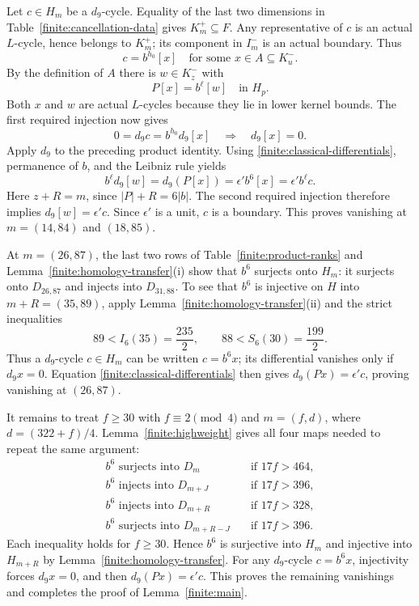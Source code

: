 \documentclass[11pt]{article}
\theoremstyle{definition}
\theoremstyle{remark}
\numberwithin{equation}{section}
\begin{document}
Let $c\in H_m$ be a $d_9$-cycle.  Equality of the last two
dimensions in Table~\ref{finite:cancellation-data} gives
$K^+_m\subseteq F$.  Any representative of $c$ is an actual
$L$-cycle, hence belongs to $K^+_m$; its component in $I^-_m$ is
an actual boundary.  Thus
\[
 c=b^{h_0}[x]\quad\text{for some }x\in A\subseteq K^-_u.
\]
By the definition of $A$ there is $w\in K^-_z$ with
\[
 P[x]=b^\ell[w]\quad\text{in }H_p.
\]
Both $x$ and $w$ are actual $L$-cycles because they lie in lower
kernel bounds.  The first required injection now gives
\[
 0=d_9c=b^{h_0}d_9[x]\quad\Longrightarrow\quad d_9[x]=0.
\]
Apply $d_9$ to the preceding product identity.  Using
\eqref{finite:classical-differentials}, permanence of $b$, and the
Leibniz rule yields
\[
 b^\ell d_9[w]=d_9(P[x])=\epsilon'b^6[x]
                         =\epsilon'b^\ell c.
\]
Here $z+R=m$, since $|P|+R=6|b|$.
The second required injection therefore implies
$d_9[w]=\epsilon'c$.  Since $\epsilon'$ is a unit, $c$ is a
boundary.  This proves vanishing at $m=(14,84)$ and $(18,85)$.

At $m=(26,87)$, the last two rows of
Table~\ref{finite:product-ranks} and
Lemma~\ref{finite:homology-transfer}\textup{(i)} show that $b^6$
surjects onto $H_m$: it surjects onto $D_{26,87}$ and injects into
$D_{31,88}$.  To see that $b^6$ is injective on $H$ into
$m+R=(35,89)$, apply
Lemma~\ref{finite:homology-transfer}\textup{(ii)} and the strict
inequalities
\[
 89<I_6(35)=\frac{235}{2},\qquad
 88<S_6(30)=\frac{199}{2}.
\]
Thus a $d_9$-cycle $c\in H_m$ can be written $c=b^6x$; its
differential vanishes only if $d_9x=0$.  Equation
\eqref{finite:classical-differentials} then gives
$d_9(Px)=\epsilon'c$, proving vanishing at $(26,87)$.

It remains to treat $f\geq30$ with $f\equiv2\pmod4$ and
$m=(f,d)$, where $d=(322+f)/4$.  Lemma~\ref{finite:highweight}
gives all four maps needed to repeat the same argument:
\begin{align*}
 b^6\text{ surjects into }D_m
   &\quad\text{if }17f>464,\\
 b^6\text{ injects into }D_{m+J}
   &\quad\text{if }17f>396,\\
 b^6\text{ injects into }D_{m+R}
   &\quad\text{if }17f>328,\\
 b^6\text{ surjects into }D_{m+R-J}
   &\quad\text{if }17f>396.
\end{align*}
Each inequality holds for $f\geq30$.  Hence $b^6$ is surjective
into $H_m$ and injective into $H_{m+R}$ by
Lemma~\ref{finite:homology-transfer}.  For any $d_9$-cycle
$c=b^6x$, injectivity forces $d_9x=0$, and then
$d_9(Px)=\epsilon'c$.  This proves the remaining vanishings and
completes the proof of Lemma~\ref{finite:main}.
\end{document}
